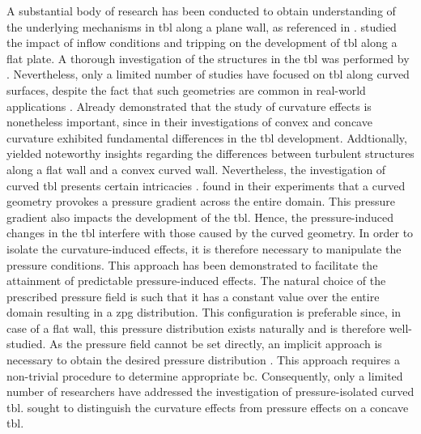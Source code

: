A substantial body of research has been conducted to obtain understanding of the underlying mechanisms  in \acrfull{tbl} along a plane wall, as referenced in \citep{pargal_adverse-pressure-gradient_2022}.
\citet{schlatter_turbulent_2012} studied the impact of inflow conditions and tripping on the development of \acrshort{tbl} along a flat plate.
A thorough investigation of the structures in the \acrshort{tbl} was performed by \citet{jimenez_near-wall_2013}.
Nevertheless, only a limited number of studies have focused on \acrshort{tbl} along curved surfaces, despite the fact that such geometries are common in real-world applications \citep{spalart_direct_2024}.
Already \citet{muck_effect_1985} demonstrated that the study of curvature effects is  nonetheless important, since in their investigations of convex and concave curvature exhibited fundamental differences in the \acrshort{tbl} development.
Addtionally, \citet{chiwanga_effect_1993} yielded noteworthy insights   regarding the differences between turbulent structures along a flat wall and a convex curved wall.
Nevertheless, the investigation of curved \acrshort{tbl} presents certain  intricacies \citep{appelbaum_systematic_2025}.
\citet{so_experiment_1973} found in their experiments that a curved geometry provokes a pressure gradient across the entire domain.
This pressure gradient also impacts the development of the \acrshort{tbl}.
Hence, the pressure-induced changes in the \acrshort{tbl} interfere with those caused by the curved geometry.
In order to isolate the curvature-induced effects, it is therefore necessary to manipulate the pressure conditions.
This approach has been demonstrated to facilitate the attainment of predictable pressure-induced effects.
The natural choice of the prescribed pressure field is such that it has a constant value over the entire domain resulting in a \acrfull{zpg} distribution.
This configuration is preferable since, in case of  a flat wall,  this pressure distribution exists naturally and is therefore well-studied.
As the pressure field cannot be set directly, an implicit approach is necessary to obtain the desired pressure distribution \citep{appelbaum_systematic_2025}.
This approach requires a non-trivial procedure to determine appropriate \acrfull{bc}. Consequently, only a limited number of researchers have addressed the investigation of pressure-isolated curved \acrshort{tbl}.
\citet{appelbaum_systematic_2025}  sought to distinguish the curvature effects from pressure effects on a concave \acrshort{tbl}. 


